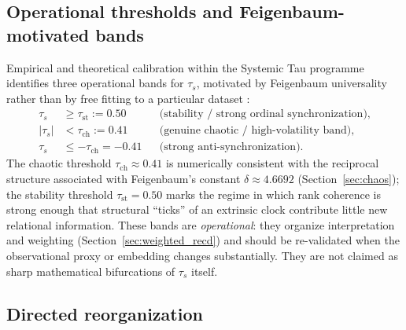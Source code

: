 \documentclass[11pt,a4paper]{article}
\begin{document}
\subsection{Operational thresholds and Feigenbaum-motivated bands}

Empirical and theoretical calibration within the Systemic Tau programme
identifies three operational bands for $\tau_s$, motivated by Feigenbaum
universality rather than by free fitting to a particular dataset
\cite{Feigenbaum1978,Feigenbaum1983,Padilla2026synthesis}:
\begin{equation}
\label{eq:bands}
\begin{aligned}
\tau_s &\geq \tau_{\mathrm{st}} := 0.50
&&\text{(stability / strong ordinal synchronization)},\\
|\tau_s| &< \tau_{\mathrm{ch}} := 0.41
&&\text{(genuine chaotic / high-volatility band)},\\
\tau_s &\leq -\tau_{\mathrm{ch}} = -0.41
&&\text{(strong anti-synchronization)}.
\end{aligned}
\end{equation}
The chaotic threshold $\tau_{\mathrm{ch}}\approx 0.41$ is numerically
consistent with the reciprocal structure associated with Feigenbaum's
constant $\delta\approx 4.6692$ (Section~\ref{sec:chaos}); the stability
threshold $\tau_{\mathrm{st}}=0.50$ marks the regime in which rank
coherence is strong enough that structural ``ticks'' of an extrinsic clock
contribute little new relational information. These bands are
\emph{operational}: they organize interpretation and weighting
(Section~\ref{sec:weighted_recd}) and should be re-validated when the
observational proxy or embedding changes substantially. They are not
claimed as sharp mathematical bifurcations of $\tau_s$ itself.

\subsection{Directed reorganization}
\end{document}
